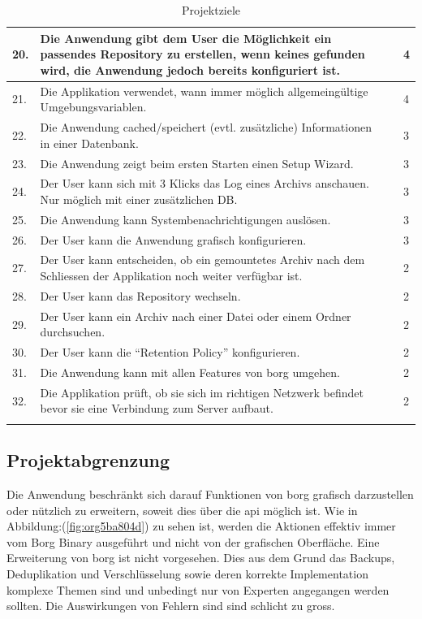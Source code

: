\begin{longtable}{|p{1cm}|p{9cm}|p{1.5cm}|p{2cm}|}
\hline
20. & Die Anwendung gibt dem User die Möglichkeit ein passendes Repository zu erstellen, wenn keines gefunden wird, die Anwendung jedoch bereits konfiguriert ist. &  & 4\\
\hline
21. & Die Applikation verwendet, wann immer möglich allgemeingültige Umgebungsvariablen. &  & 4\\
\hline
22. & Die Anwendung cached/speichert (evtl. zusätzliche) Informationen in einer Datenbank. &  & 3\\
\hline
23. & Die Anwendung zeigt beim ersten Starten einen Setup Wizard. &  & 3\\
\hline
24. & Der User kann sich mit 3 Klicks das Log eines Archivs anschauen. Nur möglich mit einer zusätzlichen DB. &  & 3\\
\hline
25. & Die Anwendung kann Systembenachrichtigungen auslösen. &  & 3\\
\hline
26. & Der User kann die Anwendung grafisch konfigurieren. &  & 3\\
\hline
27. & Der User kann entscheiden, ob ein gemountetes Archiv nach dem Schliessen der Applikation noch weiter verfügbar ist. &  & 2\\
\hline
28. & Der User kann das Repository wechseln. &  & 2\\
\hline
29. & Der User kann ein Archiv nach einer Datei oder einem Ordner durchsuchen. &  & 2\\
\hline
30. & Der User kann die "`Retention Policy"' konfigurieren. &  & 2\\
\hline
31. & Die Anwendung kann mit allen Features von \gls{borg} umgehen. &  & 2\\
\hline
32. & Die Applikation prüft, ob sie sich im richtigen Netzwerk befindet bevor sie eine Verbindung zum Server aufbaut. &  & 2\\
\hline
\caption{\label{tab:org2ab4045}
Projektziele}
\\
\end{longtable}

\newpage
\subsection{Projektabgrenzung}
\label{sec:org82d5209}

Die Anwendung beschränkt sich darauf Funktionen von \gls{borg} grafisch
darzustellen oder nützlich zu erweitern, soweit dies über die \gls{api} möglich
ist. Wie in Abbildung:(\ref{fig:org5ba804d}) zu sehen ist, werden die Aktionen effektiv
immer vom Borg Binary ausgeführt und nicht von der grafischen Oberfläche. Eine
Erweiterung von \gls{borg} ist nicht vorgesehen. Dies aus dem Grund das Backups,
Deduplikation und Verschlüsselung sowie deren korrekte Implementation komplexe
Themen sind und unbedingt nur von Experten angegangen werden sollten. Die
Auswirkungen von Fehlern sind sind schlicht zu gross.

